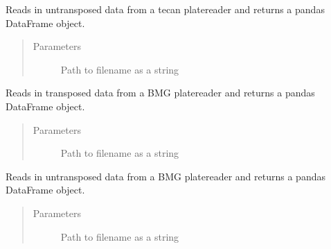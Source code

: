 \documentclass[letterpaper,10pt,english]{sphinxmanual}
\begin{document}

\begin{fulllineitems}
\label{\detokenize{platelib:platelib.plateread.read_tecan}}
Reads in untransposed data from a tecan platereader and returns a pandas DataFrame object.
\begin{quote}\begin{description}
\item[{Parameters}] \leavevmode
{} \textendash{} Path to filename as a string

\end{description}\end{quote}

\end{fulllineitems}


\begin{fulllineitems}
\label{\detokenize{platelib:platelib.plateread.read_transposed_bmg}}
Reads in transposed data from a BMG platereader and returns a pandas DataFrame object.
\begin{quote}\begin{description}
\item[{Parameters}] \leavevmode
{} \textendash{} Path to filename as a string

\end{description}\end{quote}

\end{fulllineitems}


\begin{fulllineitems}
\label{\detokenize{platelib:platelib.plateread.read_untransposed_bmg}}
Reads in untransposed data from a BMG platereader and returns a pandas DataFrame object.
\begin{quote}\begin{description}
\item[{Parameters}] \leavevmode
{} \textendash{} Path to filename as a string

\end{description}\end{quote}

\end{fulllineitems}
\end{document}
